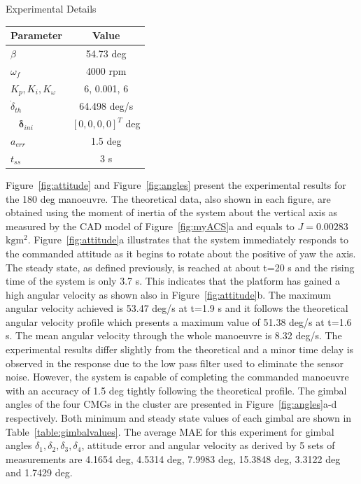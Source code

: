 \documentclass[aerospace,article,submit,moreauthors,dvi2pdf]{Definitions/mdpi}
\begin{document}
\begin{specialtable}[H] 
\caption{\label{table:experimentaldetails} Experimental Details}
\begin{tabular}{lc}
\toprule
\textbf{Parameter}  & \textbf{Value}   \\
\midrule
$\beta$         & 54.73  deg              \\
$\omega_f$   & 4000 rpm \\
$K_p, K_i, K_{\omega}$ & 6, 0.001, 6 \\
$\dot{{\delta}}_{th}$         & 64.498 deg/s          \\\ %
$\boldsymbol{\delta}_{ini}$        & $ [0, 0, 0, 0]^T $ deg \\
$a_{err}$& 1.5 deg \\
$t_{ss}$ & 3 s \\
\bottomrule
\end{tabular}
\end{specialtable}

Figure~\ref{fig:attitude} and Figure~\ref{fig:angles} present the experimental results for the 180 deg manoeuvre. The theoretical data, also shown in each figure, are obtained using the moment of inertia of the system about the vertical axis as measured by the CAD model of Figure~\ref{fig:myACS}a and equals to $J=0.00283$ $\mathrm{kgm^2}$. Figure~\ref{fig:attitude}a illustrates that the system immediately responds to the commanded attitude as it begins to rotate about the positive of yaw the axis. The steady state, as defined previously, is reached at about t=20 s and the rising time of the system is only 3.7 s. This indicates that the platform has gained a high angular velocity as shown also in Figure~\ref{fig:attitude}b. The maximum angular velocity achieved is 53.47 deg/s at t=1.9 s and it follows the theoretical angular velocity profile which presents a maximum value of 51.38 deg/s at t=1.6 s. The mean angular velocity through the whole manoeuvre is 8.32 deg/s. The experimental results differ slightly from the theoretical and a minor time delay is observed in the response due to the low pass filter used to eliminate the sensor noise. However, the system is capable of completing the commanded manoeuvre with an accuracy of 1.5 deg tightly following the theoretical profile.
The gimbal angles of the four CMGs in the cluster are presented in Figure~\ref{fig:angles}a-d respectively. Both minimum and steady state values of each gimbal are shown in Table~\ref{table:gimbalvalues}. The average MAE for this experiment for gimbal angles $\delta_1, \delta_2, \delta_3, \delta_4  $, attitude error and angular velocity as derived by 5 sets of measurements are 4.1654 deg, 4.5314 deg, 7.9983 deg, 15.3848 deg, 3.3122 deg and 1.7429 deg.
\end{document}
